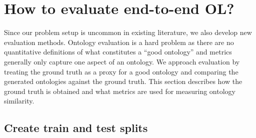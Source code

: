 \section{How to evaluate end-to-end OL?}  \label{sec:implementation:evaluation}

Since our problem setup is uncommon in existing literature, we also develop new evaluation methods. Ontology evaluation is a hard problem as there are no quantitative definitions of what constitutes a ``good ontology'' and metrics generally only capture one aspect of an ontology. We approach evaluation by treating the ground truth as a proxy for a good ontology and comparing the generated ontologies against the ground truth. This section describes how the ground truth is obtained and what metrics are used for measuring ontology similarity.


\subsection{Create train and test splits}



